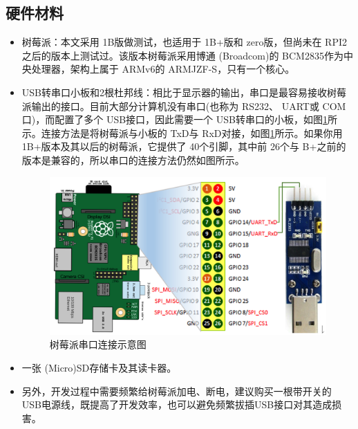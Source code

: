 \documentclass[main.tex]{subfiles}
\begin{document}
\begin{CJK*}{UTF8}{song}
\subsection{硬件材料}
\begin{itemize}
\item 树莓派：本文采用 1B版做测试，也适用于 1B+版和 zero版，但尚未在 RPI2之后的版本上测试过。该版本树莓派采用博通 (Broad\-com)的 BCM\-2835作为中央处理器，架构上属于 ARMv6的 ARM\-JZF-S，只有一个核心。

\item USB转串口小板和2根杜邦线：相比于显示器的输出，串口是最容易接收树莓派输出的接口。目前大部分计算机没有串口(也称为 RS232、 UART或 COM口)，而配置了多个 USB接口，因此需要一个 USB转串口的小板，如图\ref{figure:1-1}所示。连接方法是将树莓派与小板的 TxD与 RxD对接，如图\ref{figure:1-1}所示。如果你用 1B+版本及其以后的树莓派，它提供了 40个引脚，其中前 26个与 B+之前的版本是兼容的，所以串口的连接方法仍然如图所示。

\begin{figure}[htp]
\centering
\includegraphics[scale=0.2]{figures/1-1.png}
\caption{树莓派串口连接示意图}
\label{figure:1-1}
\end{figure}

\item 一张 (Micro)SD存储卡及其读卡器。

\item 另外，开发过程中需要频繁给树莓派加电、断电，建议购买一根带开关的 USB电源线，既提高了开发效率，也可以避免频繁拔插USB接口对其造成损害。
\end{itemize}


\end{CJK*}
\end{document}
